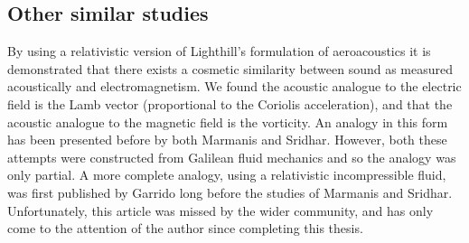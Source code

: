 




\subsection{Other similar studies}

By using a relativistic version of Lighthill's formulation of aeroacoustics it is demonstrated 
that there exists a cosmetic similarity between sound as measured acoustically and electromagnetism. 
We found the acoustic analogue to the electric field is the Lamb vector (proportional to the Coriolis acceleration),
and that the acoustic analogue to the magnetic field is the vorticity.
An analogy in this form has been presented before by both Marmanis\cite{Marmanis2000} and Sridhar\cite{Marmanis2000,Sridhar1998}.
However, both these attempts were constructed from Galilean fluid mechanics and so the analogy was only partial.
A more complete  analogy, using a relativistic incompressible fluid, was first published by Garrido\cite{Garrido1982} long before the studies of Marmanis and Sridhar.  
Unfortunately, this article was missed by the wider community, 
and has only come to the attention of the author since completing this thesis.


